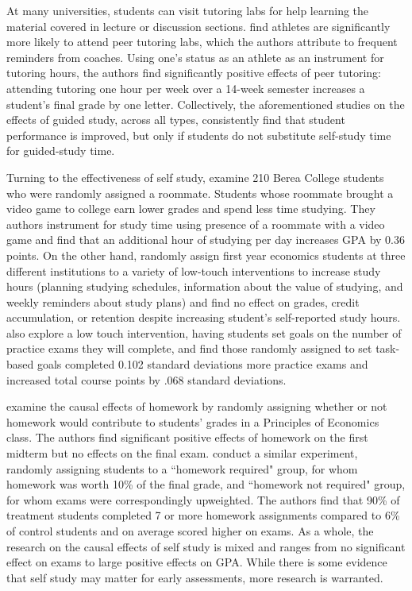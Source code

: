 \documentclass[12pt]{article}
\begin{document}
At many universities, students can visit tutoring labs for help learning the material covered in lecture or discussion sections. \textcite{mgm2010} find athletes are significantly more likely to attend peer tutoring labs, which the authors attribute to frequent reminders from coaches. Using one's status as an athlete as an instrument for tutoring hours, the authors find significantly positive effects of peer tutoring: attending tutoring one hour per week over a 14-week semester increases a student's final grade by one letter. Collectively, the aforementioned studies on the effects of guided study, across all types, consistently find that student performance is improved, but only if students do not substitute self-study time for guided-study time.

Turning to the effectiveness of self study, \textcite{ss2008} examine 210 Berea College students who were randomly assigned a roommate. Students whose roommate brought a video game to college earn lower grades and spend less time studying. They authors instrument for study time using presence of a roommate with a video game and find that an additional hour of studying per day increases GPA by 0.36 points. On the other hand, \textcite{oppp2019} randomly assign first year economics students at three different institutions to a variety of low-touch interventions to increase study hours (planning studying schedules, information about the value of studying, and weekly reminders about study plans) and find no effect on grades, credit accumulation, or retention despite increasing student's self-reported study hours. \textcite{cgpr2020} also explore a low touch intervention, having students set goals on the number of practice exams they will complete, and find those randomly assigned to set task-based goals completed 0.102 standard deviations more practice exams and increased total course points by .068 standard deviations.

\textcite{ts2012} examine the causal effects of homework by randomly assigning whether or not homework would contribute to students' grades in a Principles of Economics class. The authors find significant positive effects of homework on the first midterm but no effects on the final exam. \textcite{gr2013} conduct a similar experiment, randomly assigning students to a ``homework required" group, for whom homework was worth 10\% of the final grade, and ``homework not required" group, for whom exams were correspondingly upweighted. The authors find that 90\% of treatment students completed 7 or more homework assignments compared to 6\% of control students and on average scored higher on exams. As a whole, the research on the causal effects of self study is mixed and ranges from no significant effect on exams to large positive effects on GPA. While there is some evidence that self study may matter for early assessments, more research is warranted.
\end{document}
